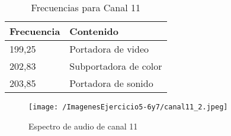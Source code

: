 \begin{table}[H]
\centering
\begin{tabular}{|l|l|}
\hline
Frecuencia & Contenido             \\ \hline
199,25     & Portadora de video    \\ \hline
202,83     & Subportadora de color \\ \hline
203,85     & Portadora de sonido   \\ \hline
\end{tabular}
\caption{Frecuencias para Canal 11}
\label{tab:ch}
\end{table}

\begin{figure}[H]
	\centering
	\texttt{[image: /ImagenesEjercicio5-6y7/canal11\_2.jpeg]}
	\caption{Espectro de audio de canal 11}	
	\label{fig:canal11}
\end{figure}
